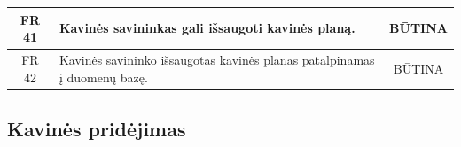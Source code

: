 \documentclass{VUMIFPSkursinis}
\begin{document}
\begin{center}
\begin{table}[H]
\begin{tabular}{|p{2cm}|p{}|p{}|}
		\multicolumn{1}{|c|}{FR 41}&
		{Kavinės savininkas gali išsaugoti kavinės planą.}&
		\multicolumn{1}{|c|}{BŪTINA}\\				
	\hline
	
		\multicolumn{1}{|c|}{FR 42}&
		{Kavinės savininko išsaugotas kavinės planas patalpinamas į duomenų bazę.}&
		\multicolumn{1}{|c|}{BŪTINA}\\				
	\hline
	
	\end{tabular}
	
	\label{table:KavinėsPlanavimas}
	\end{table}
	
	
\end{center}

\pagebreak

\subsection{Kavinės pridėjimas}
\end{document}
